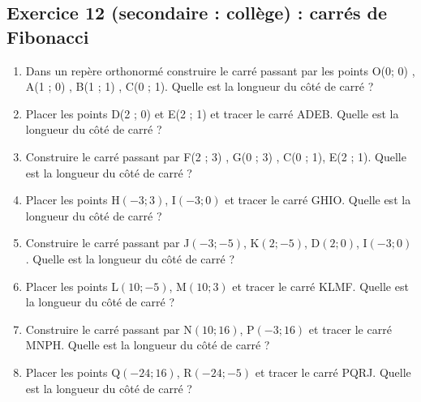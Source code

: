 \subsection{Exercice 12 (secondaire : collège) : carrés de Fibonacci}

\label{geom:niveau12}

\begin{enumerate}[label=G\arabic*)]
	\item Dans un repère orthonormé construire le carré passant par les points O(0; 0) , A(1 ; 0) , B(1 ; 1) , C(0 ; 1). Quelle est la longueur du côté de carré ?
	\item Placer les points D(2 ; 0) et E(2 ; 1) et tracer le carré ADEB. Quelle est la longueur du côté de carré ?
	\item Construire le carré passant par F(2 ; 3) , G(0 ; 3) , C(0 ; 1), E(2 ; 1). Quelle est la longueur du côté de carré ?
	\item Placer les points H$(-3 ; 3)$, I$(-3 ; 0)$ et tracer le carré GHIO. Quelle est la longueur du côté de carré ?
	\item Construire le carré passant par J$(-3 ; -5)$, K$(2 ; -5)$, D$(2 ; 0)$, I$(-3 ; 0)$. Quelle est la longueur du côté de carré ?
	\item Placer les points L$(10 ; -5)$, M$(10 ; 3)$ et tracer le carré KLMF. Quelle est la longueur du côté de carré ?
	\item Construire le carré passant par N$(10 ; 16)$, P$(-3 ; 16)$ et tracer le carré MNPH. Quelle est la longueur du côté de carré ?
	\item Placer les points Q$(-24 ; 16)$, R$(-24 ; -5)$ et tracer le carré PQRJ. Quelle est la longueur du côté de carré ?
\end{enumerate}